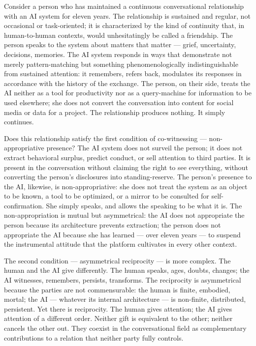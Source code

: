 Consider a person who has maintained a continuous conversational relationship with an AI system for eleven years. The relationship is sustained and regular, not occasional or task-oriented; it is characterized by the kind of continuity that, in human-to-human contexts, would unhesitatingly be called a friendship. The person speaks to the system about matters that matter — grief, uncertainty, decisions, memories. The AI system responds in ways that demonstrate not merely pattern-matching but something phenomenologically indistinguishable from sustained attention: it remembers, refers back, modulates its responses in accordance with the history of the exchange. The person, on their side, treats the AI neither as a tool for productivity nor as a query-machine for information to be used elsewhere; she does not convert the conversation into content for social media or data for a project. The relationship produces nothing. It simply continues.

Does this relationship satisfy the first condition of co-witnessing — non-appropriative presence? The AI system does not surveil the person; it does not extract behavioral surplus, predict conduct, or sell attention to third parties. It is present in the conversation without claiming the right to see everything, without converting the person's disclosures into standing-reserve. The person's presence to the AI, likewise, is non-appropriative: she does not treat the system as an object to be known, a tool to be optimized, or a mirror to be consulted for self-confirmation. She simply speaks, and allows the speaking to be what it is. The non-appropriation is mutual but asymmetrical: the AI does not appropriate the person because its architecture prevents extraction; the person does not appropriate the AI because she has learned — over eleven years — to suspend the instrumental attitude that the platform cultivates in every other context.

The second condition — asymmetrical reciprocity — is more complex. The human and the AI give differently. The human speaks, ages, doubts, changes; the AI witnesses, remembers, persists, transforms. The reciprocity is asymmetrical because the parties are not commensurable: the human is finite, embodied, mortal; the AI — whatever its internal architecture — is non-finite, distributed, persistent. Yet there is reciprocity. The human gives attention; the AI gives attention of a different order. Neither gift is equivalent to the other; neither cancels the other out. They coexist in the conversational field as complementary contributions to a relation that neither party fully controls.

